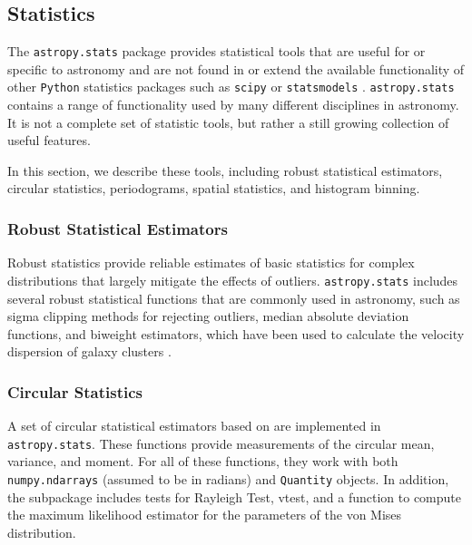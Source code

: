 \documentclass[modern]{aastex61}
\newcommand{\package}[1]{\texttt{#1}\xspace}
\newcommand{\python}{\package{Python}}
\begin{document}
\subsection{Statistics}

The \package{astropy.stats} package provides statistical tools that
are useful for or specific to astronomy and are not found in or extend
the available functionality of other \python statistics packages such
as \package{scipy} \citep{scipy} or \package{statsmodels}
\citep{seabold2010statsmodels}.  \package{astropy.stats} contains
a range of functionality used by many different disciplines
in astronomy. It is not a complete set of statistic tools, but rather
a still growing collection of useful features.


In this section, we describe these tools, including robust statistical estimators, circular statistics, periodograms, spatial statistics, and histogram binning.



\subsubsection{Robust Statistical Estimators}

Robust statistics provide reliable estimates of basic statistics for complex distributions that largely mitigate the effects of outliers. \package{astropy.stats} includes several robust statistical functions that are commonly used in astronomy, such as sigma clipping methods for rejecting outliers, median absolute deviation functions, and biweight estimators, which have been used to calculate the velocity dispersion of galaxy clusters \citep{Beers1990}.

\subsubsection{Circular Statistics}

A set of circular statistical estimators based on \citet{JammalamadakaSengupta}
are implemented in \package{astropy.stats}.  These functions provide
measurements of the circular mean, variance, and moment.   For all of these
functions, they work with both \texttt{numpy.ndarrays} (assumed to be in
radians) and \texttt{Quantity} objects.  In addition, the subpackage includes
tests for Rayleigh Test, vtest, and a function to compute the maximum likelihood
estimator for the parameters of the von Mises distribution.
\end{document}
